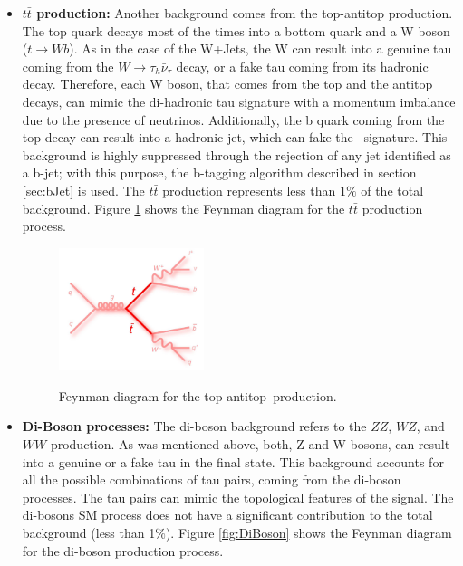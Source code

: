 \begin{itemize}
\item \textbf{$t\bar{t}$ production:} Another background comes from
the top-antitop production. The top quark decays most of the times into a
bottom quark and a W boson ($t\rightarrow Wb$). As in the case 
of the W+Jets, the W can result into a genuine tau coming from 
the $W\rightarrow \tau_{h} \bar{\nu}_{\tau}$ decay, or a fake tau 
coming from its hadronic decay. Therefore, each W boson, that comes 
from the top and the antitop decays, can mimic the di-hadronic tau 
signature with a momentum imbalance due to the presence of neutrinos. Additionally, 
the b quark coming from the top decay can result into a hadronic 
jet, which can fake the \tauh~signature. This background is highly suppressed
through the rejection of any jet identified as a b-jet; with this purpose, the b-tagging algorithm
described in section \ref{sec:bJet} is used. The $t\bar{t}$ production represents 
less than $1\%$ of the total background. Figure \ref{fig:ttbar} shows the Feynman 
diagram for the $t\bar{t}$ production process.

\begin{figure}[ht]
 \begin{center} \label{fig:ttbar}
 \captionsetup[subfloat]{farskip=0pt,captionskip=0.0cm,labelformat=empty}
 \includegraphics[clip,width=0.4\textwidth]{figuras/Chapter4/Background5}
 \caption{
  Feynman diagram for the top-antitop~production.
   }
 \label{fig:ttbar}
\end{center}
\end{figure}

\item \textbf{Di-Boson processes:} The di-boson background refers to 
the $ZZ$, $WZ$, and $WW$ production. As was mentioned above, 
both, Z and W bosons, can result into a genuine or a fake tau 
in the final state. This background accounts
for all the possible combinations of tau pairs, 
coming from the di-boson processes. The tau pairs 
 can mimic the topological features of the signal. The di-bosons 
 SM process does not have a significant contribution 
 to the total background (less than 1$\%$). Figure \ref{fig:DiBoson} shows the Feynman 
diagram for the di-boson production process.


\end{itemize}
